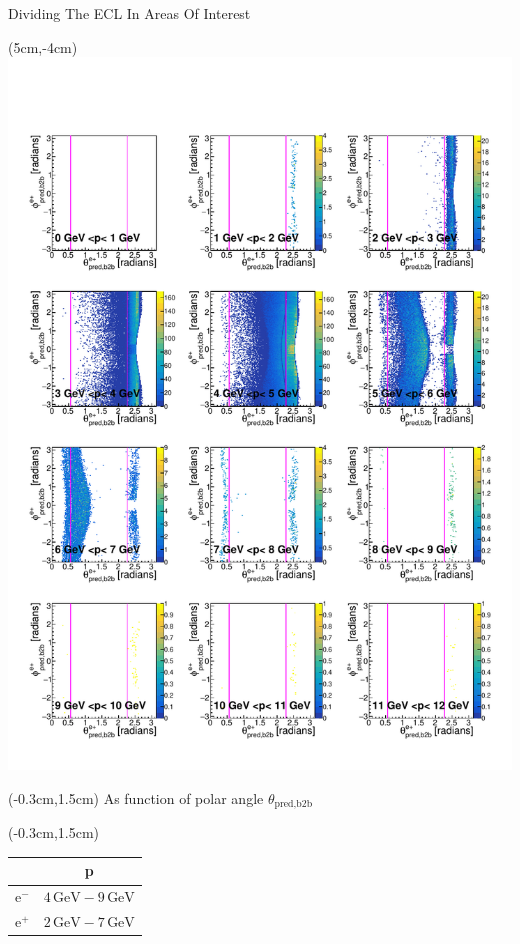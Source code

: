\documentclass[8pt]{beamer}
\begin{document}
\begin{frame}{Dividing The ECL In Areas Of Interest}
	
	\begin{textblock*}{6.5cm}(5cm,-4cm)
		\includegraphics[width=\textwidth]{VBilder/RTPMepD_MC}
	\end{textblock*}
	
	
	\pause[4]
	
	\begin{textblock*}{5cm}(-0.3cm,1.5cm)
	As function of polar angle $\theta_{\textrm{pred,b2b}}$
\end{textblock*}
\begin{textblock*}{5cm}(-0.3cm,1.5cm)
	\begin{table}[h!]
		\centering
		\begin{tabular}{lc}
			&p\\
			\hline
			$\textrm{e}^-$& $4\,\textrm{GeV} - 9\,\textrm{GeV}$\\	
			\pause[5]
			$\textrm{e}^+$& $2\,\textrm{GeV} - 7\,\textrm{GeV}$\\	
		\end{tabular}
		
	\end{table}
\end{textblock*}









\end{frame}
\end{document}
